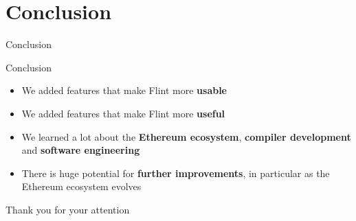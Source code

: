 \documentclass[aspectratio=169]{beamer}
\newcommand{\sectionslide}[1]{%
  \section{#1}
  \begin{frame}
  \begin{center}
    \vbox{}
    {\LARGE \usebeamercolor[fg]{title} #1}
    \par
  \end{center}
  \end{frame}
}
\begin{document}
\sectionslide{Conclusion}
%
%
\begin{frame}{Conclusion}
    \begin{center}
        \begin{itemize}
            \item We added features that make Flint more \textbf{usable}
            \item We added features that make Flint more \textbf{useful}
            \item We learned a lot about the \textbf{Ethereum ecosystem}, \textbf{compiler development} and \textbf{software engineering}
            \item There is huge potential for \textbf{further improvements}, in particular as the Ethereum ecosystem evolves
        \end{itemize}
    \end{center}
\end{frame}

\begin{frame}
 	\vbox{}
	\begin{center}
	\LARGE{} Thank you for your attention
	\end{center}
\end{frame}


\end{document}
